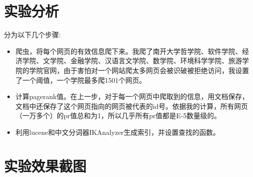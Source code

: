 ﻿\documentclass[UTF8]{ctexart}
\begin{document}
\begin{flushleft}
\section{实验分析}
分为以下几个步骤:
\begin{itemize}
  \item 爬虫，将每个网页的有效信息爬下来。我爬了南开大学哲学院、软件学院、经济学院、文学院、金融学院、汉语言文学院、数学院、环境科学学院、旅游学院的学院官网，由于害怕对一个网站爬太多网页会被识破被拒绝访问，我设置了一个阈值，一个学院最多爬1501个网页。
  \item 	 计算pagerank值。在上一步，对于每一个网页中爬取到的信息，用文档保存，文档中还保存了这个网页指向的网页被代表的id号。依据我的计算，所有网页（一万多个）的pr值总和为1，所以几乎所有pr值都是E-5数量级的。
  \item
      利用lucene和中文分词器IKAnalyzer生成索引，并设置查找的函数。
\end{itemize}
\section{实验效果截图}

\end{flushleft}
\end{document}
